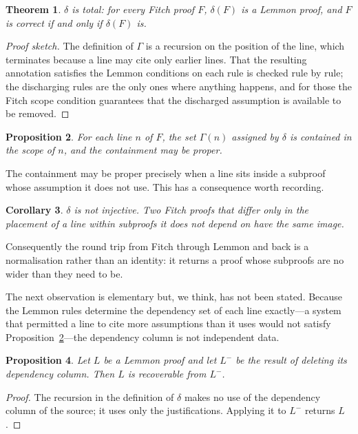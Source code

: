 \documentclass[11pt]{article}
\theoremstyle{plain}
\newtheorem{theorem}{Theorem}
\newtheorem{proposition}[theorem]{Proposition}
\newtheorem{corollary}[theorem]{Corollary}
\theoremstyle{definition}
\theoremstyle{remark}
\begin{document}
\begin{theorem}\label{thm:total}
$\delta$ is total: for every Fitch proof $F$, $\delta(F)$ is a Lemmon proof,
and $F$ is correct if and only if $\delta(F)$ is.
\end{theorem}

\begin{proof}[Proof sketch]
The definition of $\Gamma$ is a recursion on the position of the line, which
terminates because a line may cite only earlier lines. That the resulting
annotation satisfies the Lemmon conditions on each rule is checked rule by
rule; the discharging rules are the only ones where anything happens, and for
those the Fitch scope condition guarantees that the discharged assumption is
available to be removed.
\end{proof}

\begin{proposition}\label{prop:minimal}
For each line $n$ of $F$, the set $\Gamma(n)$ assigned by $\delta$ is
contained in the scope of $n$, and the containment may be proper.
\end{proposition}

The containment may be proper precisely when a line sits inside a subproof
whose assumption it does not use. This has a consequence worth recording.

\begin{corollary}\label{cor:notinjective}
$\delta$ is not injective. Two Fitch proofs that differ only in the placement
of a line within subproofs it does not depend on have the same image.
\end{corollary}

Consequently the round trip from Fitch through Lemmon and back is a
normalisation rather than an identity: it returns a proof whose subproofs are
no wider than they need to be.

The next observation is elementary but, we think, has not been stated. Because
the Lemmon rules determine the dependency set of each line exactly---a system
that permitted a line to cite more assumptions than it uses would not satisfy
Proposition~\ref{prop:minimal}---the dependency column is not independent
data.

\begin{proposition}\label{prop:redundant}
Let $L$ be a Lemmon proof and let $L^{-}$ be the result of deleting its
dependency column. Then $L$ is recoverable from $L^{-}$.
\end{proposition}

\begin{proof}
The recursion in the definition of $\delta$ makes no use of the dependency
column of the source; it uses only the justifications. Applying it to $L^{-}$
returns $L$.
\end{proof}
\end{document}
